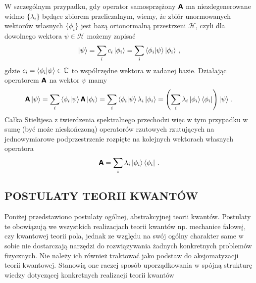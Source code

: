 \documentclass{myclass}
\begin{document}
W szczególnym przypadku, gdy operator samosprzężony \(\boldsymbol{\mathsf{A}}\) ma niezdegenerowane widmo
\(\{\lambda_i\}\) będące zbiorem przeliczalnym, wiemy, że zbiór unormowanych wektorów własnych
\(\{\phi_i\}\) jest bazą ortonormalną przestrzeni \(\mathscr{H}\), czyli dla dowolnego wektora
\(\psi \in \mathscr{H}\) możemy zapisać
\begin{equation*}
    \ket{\psi} = \sum_{i} c_i\ket{\phi_i} = \sum_{i} \braket{\phi_i}{\psi}\ket{\phi_i}\,,
\end{equation*}
gdzie \(c_i = \braket{\phi_i}{\psi} \in \mathbb{C}\) to współrzędne wektora w zadanej bazie.
Działając operatorem \(\boldsymbol{\mathsf{A}}\) na wektor \(\psi\) mamy
\begin{equation*}
    \boldsymbol{\mathsf{A}}\ket{\psi} = \sum_{i} \braket{\phi_i}{\psi}\boldsymbol{\mathsf{A}}\ket{\phi_i} =
    \sum_{i} \braket{\phi_i}{\psi}\lambda_i\ket{\phi_i} = \left(\sum_i\lambda_i\ket{\phi_i}\bra{\phi_i}\right)\ket{\psi} \,.
\end{equation*}
Całka Stieltjesa z twierdzenia spektralnego przechodzi więc w tym przypadku w sumę (być może
nieskończoną) operatorów rzutowych rzutujących na jednowymiarowe podprzestrzenie rozpięte na
kolejnych wektorach własnych operatora
\begin{equation*}
    \boldsymbol{\mathsf{A}} = \sum_{i} \lambda_i \ket{\phi_i}\bra{\phi_i}\,.
\end{equation*}

\subsection{POSTULATY TEORII KWANTÓW}

Poniżej przedstawiono postulaty ogólnej, abstrakcyjnej teorii kwantów. Postulaty te obowiązują we
wszystkich realizacjach teorii kwantów np. mechanice falowej, czy kwantowej teorii pola, jednak ze
względu na swój ogólny charakter same w sobie nie dostarczają narzędzi do rozwiązywania żadnych
konkretnych problemów fizycznych. Nie należy ich również traktować jako podstaw do aksjomatyzacji
teorii kwantowej. Stanowią one raczej sposób uporządkowania w spójną strukturę wiedzy dotyczącej
konkretnych realizacji teorii kwantów
\medskip
\end{document}
